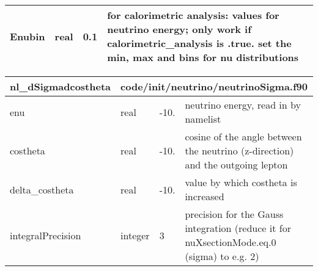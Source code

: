 \documentclass{article}
\begin{document}
\begin{longtable}{llll}
\midrule
Enubin & \begin{minipage}[t]{2cm}real\end{minipage} & \begin{minipage}[t]{2cm}0.1\end{minipage} & \begin{minipage}[t]{12cm}for calorimetric analysis: values for neutrino energy; only work if calorimetric\_analysis is .true. set the min, max and bins for nu distributions\end{minipage}\\*
\bottomrule
\end{longtable}
{ }




\begin{longtable}{llll}
\toprule
\textbf{\large{nl\_dSigmadcostheta}} & \multicolumn{3}{l}{\footnotesize{code/init/neutrino/neutrinoSigma.f90}}\\*
\midrule
\endfirsthead
\midrule
\endhead
enu & \begin{minipage}[t]{2cm}real\end{minipage} & \begin{minipage}[t]{2cm}-10.\end{minipage} & \begin{minipage}[t]{12cm}neutrino energy, read in by namelist\end{minipage}\\*
\midrule
costheta & \begin{minipage}[t]{2cm}real\end{minipage} & \begin{minipage}[t]{2cm}-10.\end{minipage} & \begin{minipage}[t]{12cm}cosine of the angle between the neutrino (z-direction) and the outgoing lepton\end{minipage}\\*
\midrule
delta\_costheta & \begin{minipage}[t]{2cm}real\end{minipage} & \begin{minipage}[t]{2cm}-10.\end{minipage} & \begin{minipage}[t]{12cm}value by which costheta is increased\end{minipage}\\*
\midrule
integralPrecision & \begin{minipage}[t]{2cm}integer\end{minipage} & \begin{minipage}[t]{2cm}3\end{minipage} & \begin{minipage}[t]{12cm}precision for the Gauss integration (reduce it for nuXsectionMode.eq.0 (sigma) to e.g. 2)\end{minipage}\\*

\end{longtable}
\end{document}
